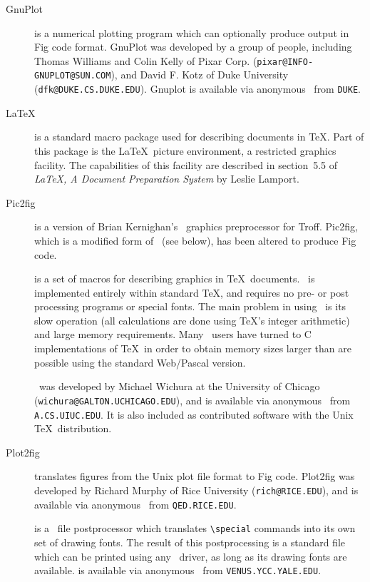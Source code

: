 \begin{description}
\item[GnuPlot]
	is a numerical plotting program which can optionally produce output
	in Fig code format.
GnuPlot was developed by a group of people, including
	Thomas Williams and Colin Kelly of Pixar Corp.
	({\tt pixar@INFO-GNUPLOT@SUN.COM}),
	and David F. Kotz of Duke University ({\tt dfk@DUKE.CS.DUKE.EDU}).
Gnuplot is available via anonymous \FTP\ from {\tt DUKE}.

\item[\LaTeX]
	is a standard macro package used for describing documents in \TeX.
Part of this package is the \LaTeX\ picture environment, a restricted
	graphics facility.
The capabilities of this facility are described in section~5.5 of
	{\em \LaTeX, A Document Preparation System} by Leslie Lamport.

\item[Pic2fig]
	is a version of Brian Kernighan's \PIC\ graphics preprocessor
	for Troff.
Pic2fig, which is a modified form of \tpic\ (see below), has been altered
	to produce Fig code.

\item[\PicTeX]
	is a set of macros for describing graphics in \TeX\ documents.
	\PicTeX\ is implemented entirely within standard \TeX, and requires no
	pre- or post processing programs or special fonts.
The main problem in using \PicTeX\ is its slow operation (all calculations
	are done using \TeX's integer arithmetic) and large memory
	requirements.
Many \PicTeX\ users have turned to C implementations of \TeX\ in order
	to obtain memory sizes larger than are possible using the standard
	Web/Pascal version.

\PicTeX\ was developed by Michael Wichura at the University of
	Chicago ({\tt wichura@GALTON.UCHICAGO.EDU}), and is available via
	anonymous \FTP\  from {\tt A.CS.UIUC.EDU}.
It is also included as contributed software with the Unix \TeX\ distribution.

\item [Plot2fig]
	translates figures from the Unix plot file format to Fig code.
Plot2fig was developed by Richard Murphy of Rice University
	({\tt rich@RICE.EDU}),
	and is available via anonymous \FTP\ from {\tt QED.RICE.EDU}.

\item[\textyl]
	is a \DVI\ file postprocessor which translates {\verb|\special|}
commands into its own set of drawing fonts.
	The result of this postprocessing is a standard \DVI file which
can be printed using any \DVI\ driver, as long as its drawing fonts
	are available.
\textyl is available via anonymous \FTP\ from {\tt VENUS.YCC.YALE.EDU}.


\end{description}
